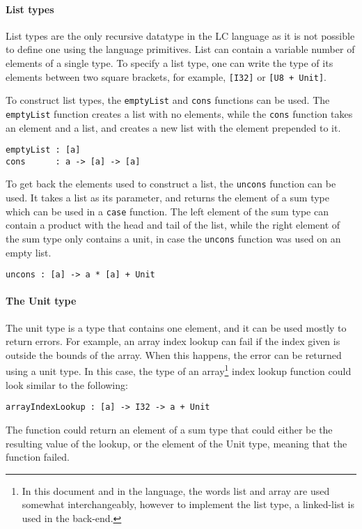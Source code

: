 \documentclass[12pt]{article}
\begin{document}
\paragraph{List types} List types are the only recursive datatype in the LC
language as it is not possible to define one using the language primitives. List
can contain a variable number of elements of a single type. To specify a list
type, one can write the type of its elements between two square brackets, for
example, \verb$[I32]$ or \verb$[U8 + Unit]$.

To construct list types, the \verb$emptyList$ and \verb$cons$ functions can be
used. The \verb$emptyList$ function creates a list with no elements, while the
\verb$cons$ function takes an element and a list, and creates a new list with
the element prepended to it.
\begin{lstlisting}
emptyList : [a]
cons      : a -> [a] -> [a]
\end{lstlisting}
To get back the elements used to construct a list, the \verb$uncons$ function
can be used. It takes a list as its parameter, and returns the element of a sum
type which can be used in a \verb$case$ function. The left element of the sum
type can contain a product with the head and tail of the list, while the right
element of the sum type only contains a unit, in case the \verb$uncons$ function
was used on an empty list.
\begin{lstlisting}
uncons : [a] -> a * [a] + Unit
\end{lstlisting}

\paragraph{The Unit type} The unit type is a type that contains one element, and
it can be used mostly to return errors. For example, an array index lookup can
fail if the index given is outside the bounds of the array. When this happens,
the error can be returned using a unit type. In this case, the type of an 
array\footnote{In this document and in the language, the words list and array 
    are used somewhat interchangeably, however to implement the list type, a
    linked-list is used in the back-end.} index lookup function could look
    similar to the following:
\begin{lstlisting}
arrayIndexLookup : [a] -> I32 -> a + Unit
\end{lstlisting}
The function could return an element of a sum type that could either be the
resulting value of the lookup, or the element of the Unit type, meaning that the
function failed.
\end{document}
